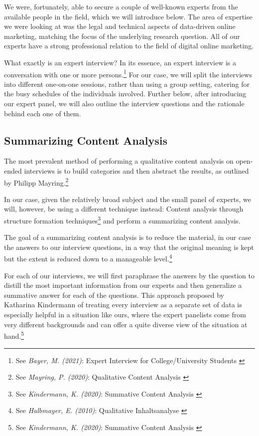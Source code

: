 We were, fortunately, able to secure a couple of well-known experts from the available people in the field, which we will introduce below. The area of expertise we were looking at was the legal and technical aspects of data-driven online marketing, matching the focus of the underlying research question. All of our experts have a strong professional relation to the field of digital online marketing.

What exactly is an expert interview? In its essence, an expert interview is a conversation with one or more persons.\footnote{See \textit{Bayer, M. (2021)}: Expert Interview for College/University Students \cite{whatIsInterview}} For our case, we will split the interviews into different one-on-one sessions, rather than using a group setting, catering for the busy schedules of the individuals involved. Further below, after introducing our expert panel, we will also outline the interview questions and the rationale behind each one of them.

\subsection{Summarizing Content Analysis} 

The most prevalent method of performing a qualitative content analysis on open-ended interviews is to build categories and then abstract the results, as outlined by Philipp Mayring.\footnote{See \textit{Mayring, P. (2020)}: Qualitative Content Analysis \cite{qualiContent}}

In our case, given the relatively broad subject and the small panel of experts, we will, however, be using a different technique instead: Content analysis through structure formation techniques\footnote{See \textit{Kindermann, K. (2020)}: Summative Content Analysis \cite{summaContent}} and perform a summarizing content analysis.

The goal of a summarizing content analysis is to reduce the material, in our case the answers to our interview questions, in a way that the original meaning is kept but the extent is reduced down to a manageable level.\footnote{See \textit{Halbmayer, E. (2010)}: Qualitative Inhaltsanalyse \cite{summaryVienna}}

For each of our interviews, we will first paraphrase the answers by the question to distill the most important information from our experts and then generalize a summative answer for each of the questions. This approach proposed by Katharina Kindermann of treating every interview as a separate set of data is especially helpful in a situation like ours, where the expert panelists come from very different backgrounds and can offer a quite diverse view of the situation at hand.\footnote{See \textit{Kindermann, K. (2020)}: Summative Content Analysis \cite{summaContent}}

